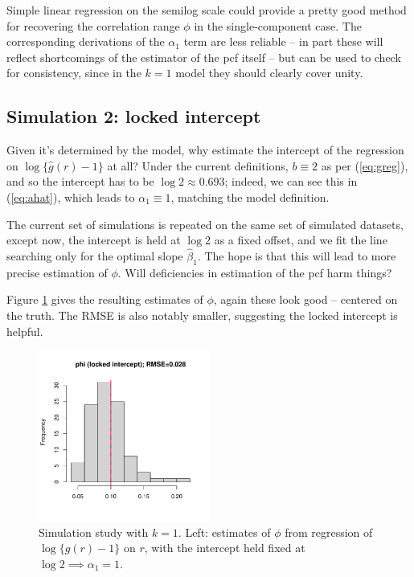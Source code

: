 \documentclass[11pt]{article}
\begin{document}
Simple linear regression on the semilog scale could provide a pretty good method for recovering the correlation range $\phi$ in the single-component case. The corresponding derivations of the $\alpha_1$ term are less reliable -- in part these will reflect shortcomings of the estimator of the pcf itself -- but can be used to check for consistency, since in the $k=1$ model they should clearly cover unity.


\subsection{Simulation 2: locked intercept}
Given it's determined by the model, why estimate the intercept of the regression on $\log\{\hat{g}(r)-1\}$ at all? Under the current definitions, $b\equiv 2$ as per (\ref{eq:greg}), and so the intercept has to be $\log 2\approx 0.693$; indeed, we can see this in (\ref{eq:ahat}), which leads to $\alpha_1\equiv 1$, matching the model definition. 

The current set of simulations is repeated on the same set of simulated datasets, except now, the intercept is held at $\log 2$ as a fixed offset, and we fit the line searching only for the optimal slope $\hat{\beta}_1$. The hope is that this will lead to more precise estimation of $\phi$. Will deficiencies in estimation of the pcf harm things?

Figure \ref{fig:phi_hist2} gives the resulting estimates of $\phi$, again these look good -- centered on the truth. The RMSE is also notably smaller, suggesting the locked intercept is helpful.

\begin{figure}[h!]
	\centering
	\includegraphics[width=0.5\textwidth]{phi_hist2.pdf}
	\caption{Simulation study with $k=1$. Left: estimates of $\phi$ from regression of $\log\{\hat g(r)-1\}$ on $r$, with the intercept held fixed at $\log 2\implies \alpha_1=1$.}
	\label{fig:phi_hist2}
\end{figure}
\end{document}
